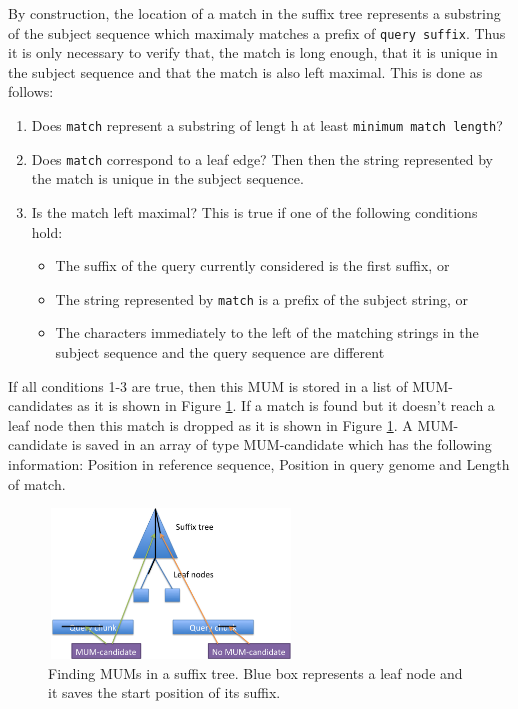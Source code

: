 \documentclass[3p,times]{elsarticle}
\begin{document}
  By construction, the location of a match in the suffix tree represents a substring of the subject sequence which maximaly matches a prefix of
  \texttt{query suffix}. Thus it is only necessary to verify that, the match is long enough, that it is unique in the subject sequence and that 
  the match is also left maximal. This is done as follows:
    \begin{enumerate}
  \item
  Does \texttt{match} represent a substring of lengt h at least \texttt{minimum match length}?
   \item 
  Does \texttt{match} correspond to a leaf edge? Then  then the string represented by the match is unique in the subject sequence.
  \item   
  Is the match left maximal? This is true if one of the following conditions hold:
  \begin{itemize}
  \item   
  The suffix of the query currently considered is the first suffix, or 
  \item 
  The string represented by \texttt{match} is a prefix of the subject string,  or
  \item  
  The characters immediately to the left of the matching strings in the subject sequence and the query sequence are different
  \end{itemize}
  \end{enumerate}
  If all conditions 1-3 are true, then this MUM is stored in a list of MUM-candidates as it is shown in Figure \ref{candidates}. If a match is found but it doesn't reach a leaf node then this match is dropped as it is shown in Figure \ref{candidates}. A MUM-candidate is saved in an array of type MUM-candidate which has the following information:
Position in reference sequence, Position in query genome and Length of match.
 \begin{figure}[htb]  
 \begin{center} 
  \includegraphics[width=6.5cm,height=4cm]{MUM-candidates.png}
 \end{center} 
 \caption{Finding MUMs in a suffix tree. Blue box represents a leaf node and it saves the start position of its suffix.} 
 \label{candidates} 
 \end{figure}  
\end{document}
